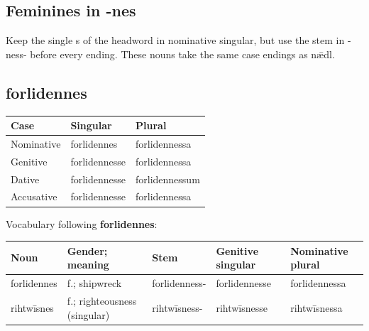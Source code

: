 \subsection*{Feminines in -nes}

Keep the single s of the headword in nominative singular, but use the stem in -ness- before every ending. These nouns take the same case endings as nǣdl.

\subsection*{forlidennes}

\par\begingroup
\fontsize{10.5}{13.2}\selectfont
\setlength{\LTleft}{0pt}\setlength{\LTright}{\fill}
\noindent
\begin{tabular}{@{}>{\raggedright\arraybackslash}p{31.99mm}>{\raggedright\arraybackslash}p{41.59mm}>{\raggedright\arraybackslash}p{44.79mm}@{}}
\toprule
\textbf{Case} & \textbf{Singular} & \textbf{Plural} \\
\midrule
Nominative & forlidennes & forlidennessa \\
Genitive & forlidennesse & forlidennessa \\
Dative & forlidennesse & forlidennessum \\
Accusative & forlidennesse & forlidennessa \\
\bottomrule
\end{tabular}
\par\endgroup

Vocabulary following \textbf{forlidennes}:

\par\begingroup
\fontsize{10.5}{13.2}\selectfont
\setlength{\LTleft}{0pt}\setlength{\LTright}{\fill}
\noindent
\begin{tabular}{@{}>{\raggedright\arraybackslash}p{19mm}>{\raggedright\arraybackslash}p{25.5mm}>{\raggedright\arraybackslash}p{22mm}>{\raggedright\arraybackslash}p{23.125mm}>{\raggedright\arraybackslash}p{23.125mm}@{}}
\toprule
\textbf{Noun} & \textbf{Gender; meaning} & \textbf{Stem} & \textbf{Genitive singular} & \textbf{Nominative plural} \\
\midrule
forlidennes & f.; shipwreck & forlidenness- & forlidennesse & forlidennessa \\
rihtwīsnes & f.; righteousness (singular) & rihtwīsness- & rihtwīsnesse & rihtwīsnessa \\
\bottomrule
\end{tabular}
\par\endgroup

